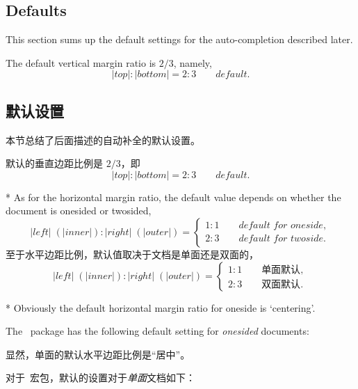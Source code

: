 \begin{paracol}{2}
 \subsection{Defaults}\label{sec:defaults}

 This section sums up the default settings for the auto-completion
 described later.
 
 The default vertical margin ratio is $2/3$, namely,
 \begin{equation}
  |top| : |bottom| = 2 : 3 \qquad\textit{default}.
 \end{equation}
\switchcolumn
\subsection{默认设置}

本节总结了后面描述的自动补全的默认设置。
 
默认的垂直边距比例是 $2/3$，即
 \begin{equation}
  |top| : |bottom| = 2 : 3 \qquad\textit{default}.
 \end{equation}

 \switchcolumn[0]*
 As for the horizontal margin ratio, the default value depends on
 whether the document is onesided or twosided,
 \begin{equation}
  |left|\;(|inner|) : |right|\;(|outer|) 
       = \left\{ \begin{array}{ll}
              1 : 1 \qquad\textit{default for oneside},\\
              2 : 3 \qquad\textit{default for twoside}.
         \end{array}\right.
 \end{equation}
\switchcolumn
至于水平边距比例，默认值取决于文档是单面还是双面的，
\begin{equation}
|left|\;(|inner|) : |right|\;(|outer|) 
    = \left\{ \begin{array}{ll}
            1 : 1 \qquad\textit{单面默认},\\
            2 : 3 \qquad\textit{双面默认}.
        \end{array}\right.
 \end{equation}

 \switchcolumn[0]*
 Obviously the default horizontal margin ratio for oneside is `centering'.

 The \Gm\ package has the following default setting for
 \textit{onesided} documents:

 \switchcolumn
 显然，单面的默认水平边距比例是“居中”。

 对于\Gm\ 宏包，默认的设置对于\textit{单面}文档如下：
\end{paracol}

